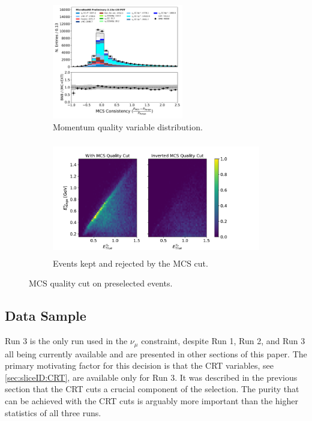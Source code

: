 \begin{figure}[hbt!] 
\begin{center}
    \begin{subfigure}[b]{0.45\textwidth}
    \centering
    \includegraphics[height=5cm]{NuMuCCsel/Images/Ryan/appendix_muonsel_input_R3/trk_p_quality_v_07232020_presel_samples_detsys_event_category.pdf}
    \caption{\label{fig:NuMUCCsel:ryan:MCSqualitydistrib} Momentum quality variable distribution.}
    \end{subfigure}
    \begin{subfigure}[b]{0.45\textwidth}
    \centering
    \includegraphics[height=5cm]{NuMuCCsel/Images/Ryan/other/EnergyRes_03202020_subplots.pdf}
    \caption{\label{fig:NuMUCCsel:ryan:MCSqualityeres} Events kept and rejected by the MCS cut.}
    \end{subfigure} \newline
\caption{MCS quality cut on preselected events.}
\label{fig:numusel:momres}
\end{center}
\end{figure}

\subsection{Data Sample}
\label{ssec:NuMUCCsel:datasample}

\par Run 3 is the only run used in the $\nu_{\mu}$ constraint, despite Run 1, Run 2, and Run 3 all being currently available and are presented in other sections of this paper. The primary motivating factor for this decision is that the CRT variables, see \cref{sec:sliceID:CRT}, are available only for Run 3. It was described in the previous section that the CRT cuts a crucial component of the selection. The purity that can be achieved with the CRT cuts is arguably more important than the higher statistics of all three runs. 

